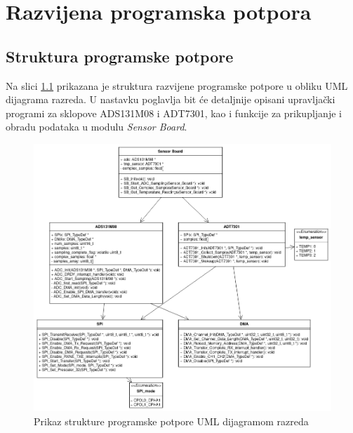 \chapter{Razvijena programska potpora}

\section{Struktura programske potpore}
Na slici \ref{fig:uml} prikazana je struktura razvijene programske potpore u obliku UML dijagrama razreda. U nastavku poglavlja bit će detaljnije opisani upravljački programi za sklopove ADS131M08 i ADT7301, kao i funkcije za prikupljanje i obradu podataka u modulu \textit{Sensor Board}.

\begin{figure}[h!]
    \centering
    \includegraphics[width=\textwidth]{slike/uml.png}
    \caption{Prikaz strukture programske potpore UML dijagramom razreda}
    \label{fig:uml}
\end{figure}

